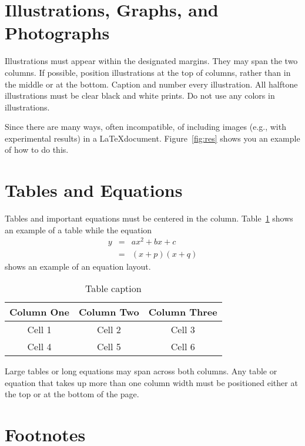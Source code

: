 \documentclass{article}
\begin{document}
\section{Illustrations, Graphs, and Photographs}
\label{sec:illust}

Illustrations must appear within the designated margins. They may span the two columns. If possible, position illustrations at the top of columns, rather than in the middle or at the bottom. Caption and number every illustration. All halftone illustrations must be clear black and white prints.  Do not use any colors in illustrations.

Since there are many ways, often incompatible, of including images (e.g., with experimental results) in a \LaTeX document. Figure~\ref{fig:res} shows you an example of how to do this.

\section{Tables and Equations}

Tables and important equations must be centered in the column. Table~\ref{tab:cap} shows an example of a table while the equation
\begin{eqnarray}
y &=& ax^2+bx+c \nonumber \\
~ &=& (x+p)(x+q)
\end{eqnarray}
shows an example of an equation layout.

\begin{table}[t]
\begin{center}
\caption{Table caption} \label{tab:cap}
\begin{tabular}{|c|c|c|}
  \hline
  Column One & Column Two & Column Three
  \\
  \hline
  Cell 1 & Cell 2 & Cell 3 \\
  Cell 4 & Cell 5 & Cell 6 \\
  \hline
\end{tabular}
\end{center}
\end{table}

Large tables or long equations may span across both columns. Any table or equation that takes up more than one column width must be positioned either at the top or at the bottom of the page.

\section{Footnotes}
\end{document}
